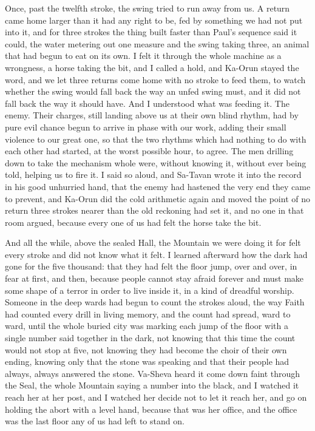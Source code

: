 Once, past the twelfth stroke, the swing tried to run away from us. A return came home larger than it had any right to be, fed by something we had not put into it, and for three strokes the thing built faster than Paul's sequence said it could, the water metering out one measure and the swing taking three, an animal that had begun to eat on its own. I felt it through the whole machine as a wrongness, a horse taking the bit, and I called a hold, and Ka-Orun stayed the word, and we let three returns come home with no stroke to feed them, to watch whether the swing would fall back the way an unfed swing must, and it did not fall back the way it should have. And I understood what was feeding it. The enemy. Their charges, still landing above us at their own blind rhythm, had by pure evil chance begun to arrive in phase with our work, adding their small violence to our great one, so that the two rhythms which had nothing to do with each other had started, at the worst possible hour, to agree. The men drilling down to take the mechanism whole were, without knowing it, without ever being told, helping us to fire it. I said so aloud, and Sa-Tavan wrote it into the record in his good unhurried hand, that the enemy had hastened the very end they came to prevent, and Ka-Orun did the cold arithmetic again and moved the point of no return three strokes nearer than the old reckoning had set it, and no one in that room argued, because every one of us had felt the horse take the bit.\par

And all the while, above the sealed Hall, the Mountain we were doing it for felt every stroke and did not know what it felt. I learned afterward how the dark had gone for the five thousand: that they had felt the floor jump, over and over, in fear at first, and then, because people cannot stay afraid forever and must make some shape of a terror in order to live inside it, in a kind of dreadful worship. Someone in the deep wards had begun to count the strokes aloud, the way Faith had counted every drill in living memory, and the count had spread, ward to ward, until the whole buried city was marking each jump of the floor with a single number said together in the dark, not knowing that this time the count would not stop at five, not knowing they had become the choir of their own ending, knowing only that the stone was speaking and that their people had always, always answered the stone. Va-Sheva heard it come down faint through the Seal, the whole Mountain saying a number into the black, and I watched it reach her at her post, and I watched her decide not to let it reach her, and go on holding the abort with a level hand, because that was her office, and the office was the last floor any of us had left to stand on.\par


